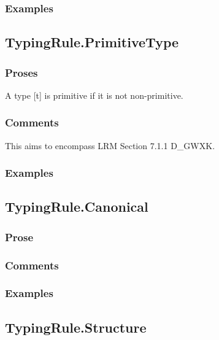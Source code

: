 \documentclass{book}
\begin{document}
    \subsubsection{Examples}

\subsection{TypingRule.PrimitiveType}

    \subsubsection{Proses} 
    A type [t] is primitive if it is not non-primitive.

    \subsubsection{Comments}
    This aims to encompass LRM Section 7.1.1 D\_GWXK.

    \subsubsection{Examples}

\subsection{TypingRule.Canonical}

     \subsubsection{Prose}

     \subsubsection{Comments}

     \subsubsection{Examples}

\subsection{TypingRule.Structure}
\end{document}
